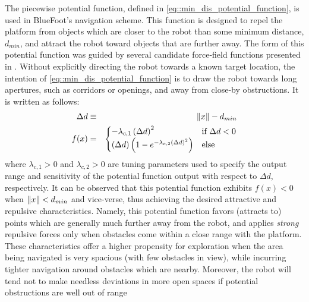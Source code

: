 			The piecewise potential function, defined in \ref{eq::min_dis_potential_function}, is used in BlueFoot's navigation scheme. This function is designed to repel the platform from objects which are closer to the robot than some minimum distance, $d_{min}$, and attract the robot toward objects that are further away. The form of this potential function was guided by several candidate force-field functions presented in \cite{ArambulaCosio2004}. Without explicitly directing the robot towards a known target location, the intention of \ref{eq::min_dis_potential_function} is to draw the robot towards long apertures, such as corridors or openings, and away from close-by obstructions. It is written as follows:
				\begin{eqnarray}
					\Delta d &\equiv& \left\lVert x\right\rVert-d_{min} \nonumber \\
					f(x) &=& 
					\begin{cases}	
					 	 -\lambda_{c,1} \left(\Delta d\right)^{2} &  \text{if } \Delta d < 0 \\
						\left(\Delta d\right) \left( 1  - e^{ -  \lambda_{c,2} { \left(\Delta d\right) }^{2} } \right) 	&  \text{else}
					\end{cases}
				\label{eq::min_dis_potential_function}
				\end{eqnarray}
			where $\lambda_{c,1}>0$ and $\lambda_{c,2}>0$ are tuning parameters used to specify the output range and sensitivity of the potential function output with respect to $\Delta d$, respectively. It can be observed that this potential function exhibits $f(x)<0$ when $\left\lVert x\right\rVert < d_{min}$ and vice-verse, thus achieving the desired attractive and repulsive characteristics. Namely, this potential function favors (attracts to) points which are generally much further away from the robot, and applies \emph{strong} repulsive forces only when obstacles come within a close range with the platform. These characteristics offer a higher propensity for exploration when the area being navigated is very spacious (with few obstacles in view), while incurring tighter navigation around obstacles which are nearby. Moreover, the robot will tend not to make needless deviations in more open spaces if potential obstructions are well out of range

